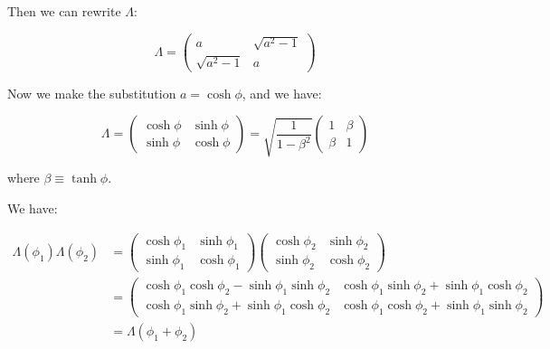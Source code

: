 \documentclass[12pt]{article}
\begin{document}
Then we can rewrite $\Lambda$:

\begin{equation}
    \Lambda = \begin{pmatrix}
        a                & \sqrt{a^{2} - 1} \\
        \sqrt{a^{2} - 1} & a
    \end{pmatrix}
\end{equation}

Now we make the substitution $a = \cosh{\phi}$, and we have:

\begin{equation}
    \Lambda = \begin{pmatrix}
        \cosh{\phi} & \sinh{\phi} \\
        \sinh{\phi} & \cosh{\phi}
    \end{pmatrix}
    =
    \sqrt{\frac{1}{1 - \beta^{2}}} \begin{pmatrix}
        1     & \beta \\
        \beta & 1
    \end{pmatrix}
\end{equation}

where $\beta \equiv \tanh{\phi}$.

We have:

\begin{equation}
    \begin{split}
        \Lambda(\phi_{1}) \Lambda(\phi_{2})
        &=
        \begin{pmatrix}
            \cosh{\phi_{1}} & \sinh{\phi_{1}} \\
            \sinh{\phi_{1}} & \cosh{\phi_{1}}
        \end{pmatrix}
        \begin{pmatrix}
            \cosh{\phi_{2}} & \sinh{\phi_{2}} \\
            \sinh{\phi_{2}} & \cosh{\phi_{2}}
        \end{pmatrix} \\
        &=
        \begin{pmatrix}
            \cosh{\phi_{1}} \cosh{\phi_{2}} - \sinh{\phi_{1}} \sinh{\phi_{2}} & \cosh{\phi_{1}} \sinh{\phi_{2}} + \sinh{\phi_{1}} \cosh{\phi_{2}} \\
            \cosh{\phi_{1}} \sinh{\phi_{2}} + \sinh{\phi_{1}} \cosh{\phi_{2}} & \cosh{\phi_{1}} \cosh{\phi_{2}} + \sinh{\phi_{1}} \sinh{\phi_{2}}
        \end{pmatrix} \\
        &= \Lambda(\phi_{1} + \phi_{2})
    \end{split}
\end{equation}
\end{document}

